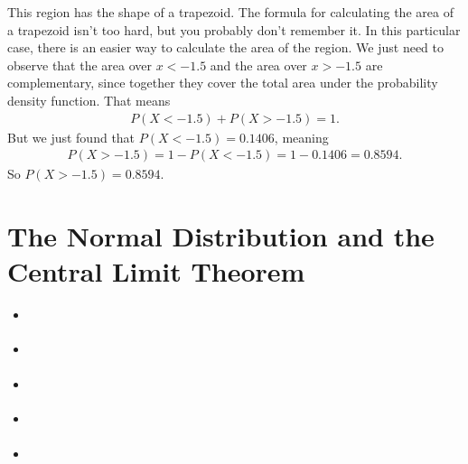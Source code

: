\documentclass[letterpaper,10pt,english]{jupyterBook}
\begin{document}
\sphinxAtStartPar
This region has the shape of a trapezoid. The formula for calculating the area of a trapezoid isn’t too hard, but you probably don’t remember it. In this particular case, there is an easier way to calculate the area of the region. We just need to observe that the area over \(x < -1.5\) and the area over \(x > -1.5\) are complementary, since together they cover the total area under the probability density function. That means
\begin{equation*}
\begin{split} P(X < -1.5) + P(X > -1.5) = 1. \end{split}
\end{equation*}
\sphinxAtStartPar
But we just found that \(P(X < -1.5) = 0.1406\), meaning
\begin{equation*}
\begin{split} P(X > -1.5) = 1 - P(X < -1.5) = 1 - 0.1406 = 0.8594. \end{split}
\end{equation*}
\sphinxAtStartPar
So \(P(X > -1.5) = 0.8594\).

\sphinxstepscope


\chapter{The Normal Distribution and the Central Limit Theorem}
\label{\detokenize{Ch4 The Normal Distribution and the Central Limit Theorem/4.0 The Normal Distribution and the Central Limit Theorem:the-normal-distribution-and-the-central-limit-theorem}}\label{\detokenize{Ch4 The Normal Distribution and the Central Limit Theorem/4.0 The Normal Distribution and the Central Limit Theorem::doc}}\begin{itemize}
\item {} 
\sphinxAtStartPar
{\hyperref[\detokenize{Ch4 The Normal Distribution and the Central Limit Theorem/4.1 Properties of the Normal Distribution::doc}]{}}

\item {} 
\sphinxAtStartPar
{\hyperref[\detokenize{Ch4 The Normal Distribution and the Central Limit Theorem/4.2 The Standard Normal Distribution::doc}]{}}

\item {} 
\sphinxAtStartPar
{\hyperref[\detokenize{Ch4 The Normal Distribution and the Central Limit Theorem/4.3 The Normal Distribution and z-scores::doc}]{}}

\item {} 
\sphinxAtStartPar
{\hyperref[\detokenize{Ch4 The Normal Distribution and the Central Limit Theorem/4.4 The Central Limit Theorem for Means::doc}]{}}

\item {} 
\sphinxAtStartPar
{\hyperref[\detokenize{Ch4 The Normal Distribution and the Central Limit Theorem/4.5 The Central Limit Theorem for Proportions::doc}]{}}

\end{itemize}
\end{document}
